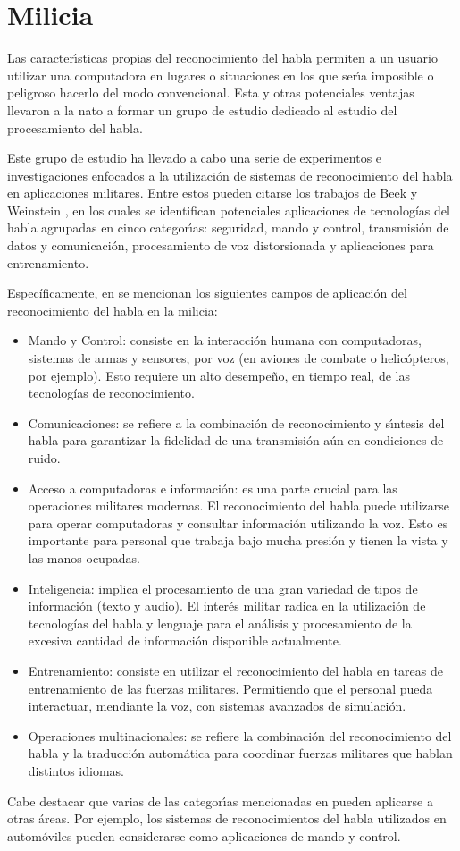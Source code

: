 \section{Milicia}
\label{sec:milicia}

Las caracter{\'\i}sticas propias del reconocimiento del habla permiten a un usuario utilizar 
una computadora en lugares o situaciones en los que ser{\'\i}a imposible o peligroso hacerlo 
del modo convencional\cite{Rufiner2004}.
Esta y otras potenciales ventajas llevaron a la \gls{nato} a formar un grupo de estudio dedicado al 
estudio del procesamiento del habla.

Este grupo de estudio ha llevado a cabo una serie de experimentos e investigaciones
enfocados a la utilización de sistemas de reconocimiento del habla en aplicaciones militares.
Entre estos pueden citarse los trabajos de Beek \cite{BeekAn1977} y 
Weinstein \cite{WeinsteinOpportunities1991}, en los cuales se identifican potenciales aplicaciones de 
tecnolog\'ias del habla agrupadas en cinco categor{\'\i}as: seguridad, mando y control, 
transmisi\'on de datos y comunicaci\'on, procesamiento de voz distorsionada y aplicaciones para
entrenamiento.

Espec\'ificamente, en \cite{PigeonUse2006} se mencionan los siguientes campos de aplicaci\'on del 
reconocimiento del habla en la milicia:

\begin{itemize}
    \item Mando y Control: consiste en la interacci\'on humana con computadoras, sistemas
	de armas y sensores, por voz (en aviones de combate o helic\'opteros, por ejemplo). Esto
	requiere un alto desempe\~no, en tiempo real, de las tecnolog\'ias de reconocimiento.
	\item Comunicaciones: se refiere a la combinaci\'on de reconocimiento y s{\'\i}ntesis del habla para
	garantizar la fidelidad de una transmisi\'on a\'un en condiciones de ruido.
    \item Acceso a computadoras e informaci\'on: es una parte crucial para las operaciones militares modernas. El
	reconocimiento del habla puede utilizarse para operar computadoras y consultar informaci\'on utilizando la voz.
	Esto es importante para personal que trabaja bajo mucha presi\'on y tienen la vista y las manos ocupadas.
    \item Inteligencia: implica el procesamiento de una gran variedad de tipos de informaci\'on (texto y audio). 
    El inter\'es militar radica en la utilizaci\'on de tecnolog\'ias del habla y lenguaje para el an\'alisis y
    procesamiento de la excesiva cantidad de informaci\'on disponible actualmente.
    \item Entrenamiento: consiste en utilizar el reconocimiento del habla en tareas de entrenamiento de las fuerzas
	militares. Permitiendo que el personal pueda interactuar, mendiante la voz, con sistemas avanzados de simulaci\'on.
	\item Operaciones multinacionales: se refiere la combinaci\'on del reconocimiento del habla y la traducci\'on
	autom\'atica para coordinar fuerzas militares que hablan distintos idiomas.
\end{itemize}

Cabe destacar que varias de las categor{\'\i}as mencionadas en \cite{PigeonUse2006} pueden aplicarse
a otras \'areas. Por ejemplo, los sistemas de reconocimientos del habla utilizados en autom\'oviles 
pueden considerarse como aplicaciones de mando y control.